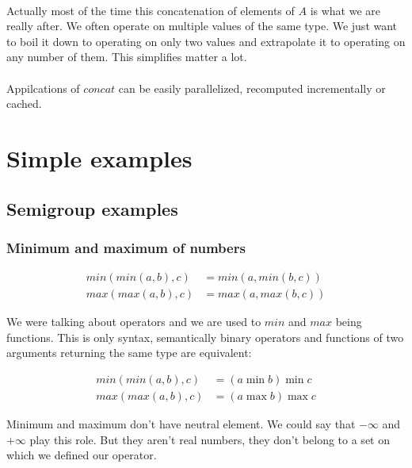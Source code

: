 \documentclass{article}
\begin{document}
    \paragraph{}
    Actually most of the time this concatenation of elements of $A$ is what we are really after. We often operate on multiple values of the same type. We just want to boil it down to operating on only two values and extrapolate it to operating on any number of them. This simplifies matter a lot.

    \paragraph{}
    Appilcations of $concat$ can be easily parallelized, recomputed incrementally or cached.


\section{Simple examples}

    \subsection{Semigroup examples}

    \subsubsection{Minimum and maximum of numbers}

    \begin{align*}
        min(min(a, b), c) &= min(a, min(b, c)) \\
        max(max(a, b), c) &= max(a, max(b, c))
    \end{align*}

    We were talking about operators and we are used to $min$ and $max$ being functions. 
    This is only syntax, semantically binary operators and functions of two arguments returning the same type are equivalent:

    \begin{align*}
        min(min(a, b), c) &= (a \min b) \min c \\ 
        max(max(a, b), c) &= (a \max b) \max c 
    \end{align*}

    Minimum and maximum don't have neutral element. 
    We could say that $-\infty$ and $+\infty$ play this role. 
    But they aren't real numbers, they don't belong to a set on which we defined our operator.
\end{document}
